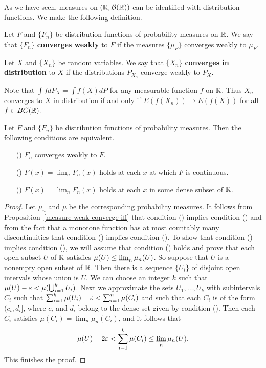 As we have seen, measures on $(\mathbb{R},\mathcal{B}(\mathbb{R}))$ can be identified with distribution functions. We make the following definition.
\begin{definition}
Let $F$ and $\{F_n\}$ be distribution functions of probability measures on $\mathbb{R}$. We say that $\{F_n\}$ \textbf{converges weakly} to $F$ if the measures $\{\mu_F\}$ converges weakly to $\mu_F$.
\end{definition}
\begin{definition}
Let $X$ and $\{X_n\}$ be random variables. We say that $\{X_n\}$ \textbf{converges in distribution} to $X$ if the distributions $P_{X_n}$ converge weakly to $P_X$.
\end{definition}
Note that $\int fdP_X=\int f(X)dP$ for any measurable function $f$ on $\mathbb{R}$. Thus $X_n$ converges to $X$ in distribution if and only if $E(f(X_n))\to E(f(X))$ for all $f\in BC(\mathbb{R})$.
\begin{proposition}\label{distribution of propability measure weakly converge iff}
Let $F$ and $\{F_n\}$ be distribution functions of probability measures. Then the following conditions are equivalent.
\begin{itemize}
\item[(\rmnum{1})] $F_n$ converges weakly to $F$.
\item[(\rmnum{2})] $F(x)=\lim_nF_n(x)$ holds at each $x$ at which $F$ is continuous.
\item[(\rmnum{3})] $F(x)=\lim_nF_n(x)$ holds at each $x$ in some dense subset of $\mathbb{R}$.
\end{itemize}
\end{proposition}
\begin{proof}
Let $\mu_n$ and $\mu$ be the corresponding probability measures. It follows from Proposition~\ref{measure weak converge iff} that condition () implies condition () and from the fact that a monotone function has at most countably many discontinuities that condition () implies condition (). To show that condition () implies condition (), we will assume that condition () holds and prove that each open subset $U$ of $\mathbb{R}$ satisfies $\mu(U)\leq\varliminf_n\mu_n(U)$. So suppose that $U$ is a nonempty open subset of $\mathbb{R}$. Then there is a sequence $\{U_i\}$ of disjoint open intervals whose union is $U$. We can choose an integer $k$ such that $\mu(U)-\varepsilon<\mu(\bigcup_{i=1}^{k}U_i)$. Next we approximate the sets $U_1,\dots,U_k$ with subintervals $C_i$ such that $\sum_{i=1}^{k}\mu(U_i)-\varepsilon<\sum_{i=1}^{n}\mu(C_i)$ and such that each $C_i$ is of the form $(c_i,d_i]$, where $c_i$ and $d_i$ belong to the dense set given by condition (). Then each $C_i$ satisfies $\mu(C_i)=\lim_n\mu_n(C_i)$, and it follows that
\[\mu(U)-2\varepsilon<\sum_{i=1}^{k}\mu(C_i)\leq\varliminf_n\mu_n(U).\]
This finishes the proof.
\end{proof}
